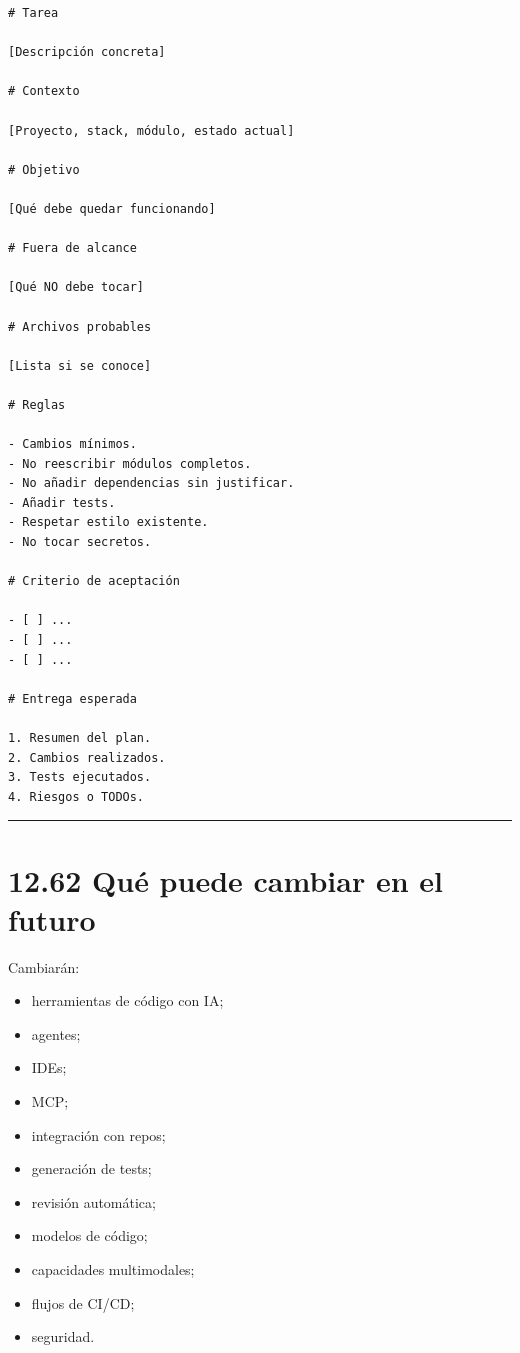 \begin{lstlisting}
# Tarea

[Descripción concreta]

# Contexto

[Proyecto, stack, módulo, estado actual]

# Objetivo

[Qué debe quedar funcionando]

# Fuera de alcance

[Qué NO debe tocar]

# Archivos probables

[Lista si se conoce]

# Reglas

- Cambios mínimos.
- No reescribir módulos completos.
- No añadir dependencias sin justificar.
- Añadir tests.
- Respetar estilo existente.
- No tocar secretos.

# Criterio de aceptación

- [ ] ...
- [ ] ...
- [ ] ...

# Entrega esperada

1. Resumen del plan.
2. Cambios realizados.
3. Tests ejecutados.
4. Riesgos o TODOs.
\end{lstlisting}

\begin{center}\rule{0.5\linewidth}{0.5pt}\end{center}

\section{12.62 Qué puede cambiar en el
futuro}\label{quuxe9-puede-cambiar-en-el-futuro-11}

Cambiarán:

\begin{itemize}
\tightlist
\item
  herramientas de código con IA;
\item
  agentes;
\item
  IDEs;
\item
  MCP;
\item
  integración con repos;
\item
  generación de tests;
\item
  revisión automática;
\item
  modelos de código;
\item
  capacidades multimodales;
\item
  flujos de CI/CD;
\item
  seguridad.
\end{itemize}

